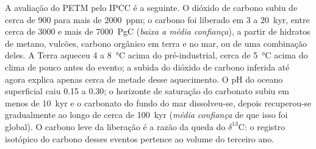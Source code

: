 A avaliação do PETM pelo IPCC é a seguinte. O dióxido de carbono subiu de cerca de 900 para mais de
\qty{2000}{ppm}; o carbono foi liberado em 3 a \qty{20}{kyr}, entre cerca de 3000 e mais de
\qty{7000}{PgC} (\emph{baixa a média confiança}), a partir de hidratos de metano, vulcões, carbono orgânico
em terra e no mar, ou de uma combinação deles. A Terra aqueceu 4 a \qty{8}{\celsius} acima do
pré-industrial, cerca de \qty{5}{\celsius} acima do clima de pouco antes do evento; a subida do dióxido de
carbono inferida até agora explica apenas cerca de metade desse aquecimento. O pH do oceano superficial caiu
0.15 a 0.30; o horizonte de saturação do carbonato subiu em menos de \qty{10}{kyr} e o carbonato
do fundo do mar dissolveu-se, depois recuperou-se gradualmente ao longo de cerca de \qty{100}{kyr} (\emph{média confiança}
de que isso foi global). O carbono leve da liberação é a razão da queda do $\delta^{13}$C: o registro isotópico
do carbono desses eventos pertence ao volume do terceiro ano.

\begin{omfigure}
\centering
{}
\par{}
\end{omfigure}

